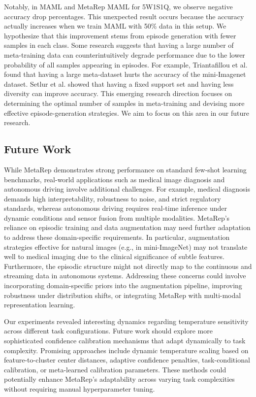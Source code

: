 Notably, in MAML and MetaRep MAML for 5W1S1Q, we observe negative accuracy drop percentages. This unexpected result occurs because the accuracy actually increases when we train MAML with 50\% data in this setup. We hypothesize that this improvement stems from episode generation with fewer samples in each class. Some research suggests that having a large number of meta-training data can counterintuitively degrade performance due to the lower probability of all samples appearing in episodes. For example, Triantafillou et al.  \cite{triantafillou2019meta} found that having a large meta-dataset hurts the accuracy of the mini-Imagenet dataset. Setlur et al. \cite{setlur2020support} showed that having a fixed support set and having less diversity can improve accuracy. This emerging research direction focuses on determining the optimal number of samples in meta-training and devising more effective episode-generation strategies. We aim to focus on this area in our future research.

\subsection{Future Work}

While MetaRep demonstrates strong performance on standard few-shot learning benchmarks, real-world applications such as medical image diagnosis and autonomous driving involve additional challenges. For example, medical diagnosis demands high interpretability, robustness to noise, and strict regulatory standards, whereas autonomous driving requires real-time inference under dynamic conditions and sensor fusion from multiple modalities. MetaRep's reliance on episodic training and data augmentation may need further adaptation to address these domain-specific requirements. In particular, augmentation strategies effective for natural images (e.g., in mini-ImageNet) may not translate well to medical imaging due to the clinical significance of subtle features. Furthermore, the episodic structure might not directly map to the continuous and streaming data in autonomous systems. Addressing these concerns could involve incorporating domain-specific priors into the augmentation pipeline, improving robustness under distribution shifts, or integrating MetaRep with multi-modal representation learning.

Our experiments revealed interesting dynamics regarding temperature sensitivity across different task configurations. Future work should explore more sophisticated confidence calibration mechanisms that adapt dynamically to task complexity. Promising approaches include dynamic temperature scaling based on feature-to-cluster center distances, adaptive confidence penalties, task-conditional calibration, or meta-learned calibration parameters. These methods could potentially enhance MetaRep's adaptability across varying task complexities without requiring manual hyperparameter tuning.

